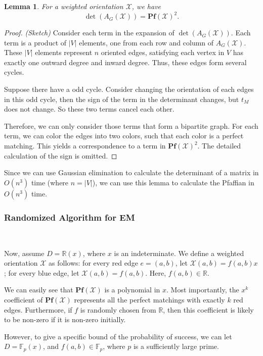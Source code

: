 \documentclass[11pt]{article}
\theoremstyle{plain}
\newtheorem{lemma}{Lemma}[section]
\begin{document}
\begin{lemma}
\label{pffa_eq_det}
For a weighted orientation $\mathcal{X}$, we have
$$\det(A_G(\mathcal{X}))=\mathbf{Pf}(\mathcal{X})^2.$$
\end{lemma}
\begin{proof}
\textit{(Sketch)} Consider each term in the expansion of $\det(A_G(\mathcal{X}))$. Each term is a product of $|V|$ elements, one from each row and column of $A_G(\mathcal{X})$. These $|V|$ elements represent $n$ oriented edges, satisfying each vertex in $V$ has exactly one outward degree and inward degree. Thus, these edges form several cycles.

Suppose there have a odd cycle. Consider changing the orientation of each edges in this odd cycle, then the sign of the term in the determinant changes, but $t_M$ does not change. So these two terms cancel each other.

Therefore, we can only consider those terms that form a bipartite graph. For each term, we can color the edges into two colors, such that each color is a perfect matching. This yields a correspondence to a term in $\mathbf{Pf}(\mathcal{X})^2$. The detailed calculation of the sign is omitted.
\end{proof}
Since we can use Gaussian elimination to calculate the determinant of a matrix in $O(n^3)$ time (where $n=|V|$), we can use this lemma to calculate the Pfaffian in $O(n^3)$ time.

\subsubsection{Randomized Algorithm for EM}\

Now, assume $D=\mathbb{R}(x)$, where $x$ is an indeterminate. We define a weighted orientation $\mathcal{X}$ as follows: for every red edge $e=(a,b)$, let $\mathcal{X}(a,b)=f(a,b)x$; for every blue edge, let $\mathcal{X}(a,b)=f(a,b)$. Here, $f(a,b)\in \mathbb{R}$. 

We can easily see that $\mathbf{Pf}(\mathcal{X})$ is a polynomial in $x$. Most importantly, the $x^k$ coefficient of $\mathbf{Pf}(\mathcal{X})$ represents all the perfect matchings with exactly $k$ red edges. Furthermore, if $f$ is randomly chosen from $\mathbb{R}$, then this coefficient is likely to be non-zero if it is non-zero initially.

However, to give a specific bound of the probability of success, we can let $D=\mathbb{F}_p(x)$, and $f(a,b)\in \mathbb{F}_p$, where $p$ is a sufficiently large prime. 
\end{document}
